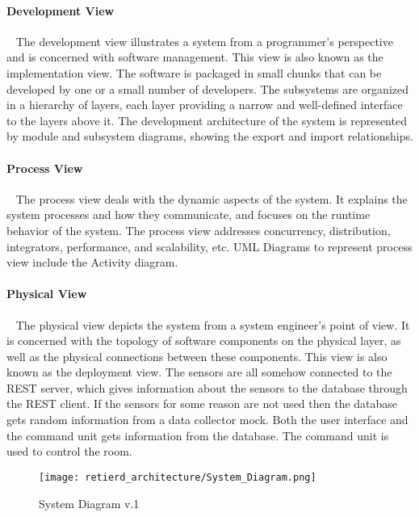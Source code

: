 \documentclass[../document]{subfiles}
\begin{document}
\paragraph{Development View} \ \newline
The development view illustrates a system from a programmer's perspective and is concerned with software management. This view is also known as the implementation view. The software is packaged in small chunks that can be developed by one or a small number of developers. The subsystems are organized in a hierarchy of layers, each layer providing a narrow and well-defined interface to the layers above it. The development architecture of the system is represented by module and subsystem diagrams, showing the export and import relationships. 
 

\paragraph{Process View} \ \newline
The process view deals with the dynamic aspects of the system. It explains the system processes and how they communicate, and focuses on the runtime behavior of the system. The process view addresses concurrency, distribution, integrators, performance, and scalability, etc. UML Diagrams to represent process view include the Activity diagram.


\paragraph{Physical View} \ \newline
The physical view depicts the system from a system engineer's point of view. It is concerned with the topology of software components on the physical layer, as well as the physical connections between these components. This view is also known as the deployment view. The sensors are all somehow connected to the REST server, which gives information about the sensors to the database through the REST client. If the sensors for some reason are not used then the database gets random information from a data collector mock. Both the user interface and the command unit gets information from the database. The command unit is used to control the room. 

\begin{figure}[H]
	\centering
	\texttt{[image: retierd\_architecture/System\_Diagram.png]}
	\caption{System Diagram v.1}
\end{figure}
\end{document}
